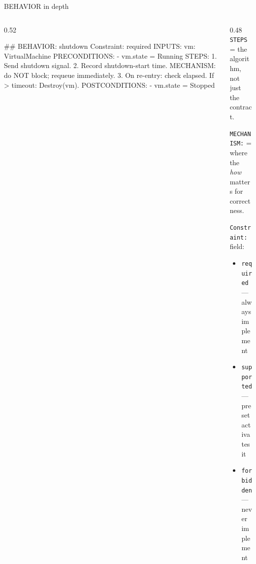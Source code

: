 \documentclass[
  10pt,
  ignorenonframetext,
  aspectratio=169,
  10pt]{beamer}
\newenvironment{Shaded}{}{}
\newcommand{\FunctionTok}[1]{\textcolor[rgb]{0.02,0.16,0.49}{#1}}
\newcommand{\NormalTok}[1]{#1}
\newcommand{\SpecialStringTok}[1]{\textcolor[rgb]{0.73,0.40,0.53}{#1}}
\providecommand{\tightlist}{%
  \setlength{\itemsep}{0pt}\setlength{\parskip}{0pt}}
\begin{document}
\begin{frame}[fragile]{BEHAVIOR in depth}
\protect\hypertarget{behavior-in-depth}{}
\begin{columns}[T]
\begin{column}{0.52\textwidth}
\begin{Shaded}
\begin{Highlighting}[]
\FunctionTok{\#\# BEHAVIOR: shutdown}
\NormalTok{Constraint: required}
\NormalTok{INPUTS:}
\NormalTok{  vm: VirtualMachine}
\NormalTok{PRECONDITIONS:}
\SpecialStringTok{  {-} }\NormalTok{vm.state = Running}
\NormalTok{STEPS:}
\SpecialStringTok{  1. }\NormalTok{Send shutdown signal.}
\SpecialStringTok{  2. }\NormalTok{Record shutdown{-}start time.}
\NormalTok{     MECHANISM: do NOT block;}
\NormalTok{     requeue immediately.}
\SpecialStringTok{  3. }\NormalTok{On re{-}entry: check elapsed.}
\NormalTok{     If \textgreater{} timeout: Destroy(vm).}
\NormalTok{POSTCONDITIONS:}
\SpecialStringTok{  {-} }\NormalTok{vm.state = Stopped}
\end{Highlighting}
\end{Shaded}
\end{column}

\begin{column}{0.48\textwidth}
\texttt{STEPS} = the algorithm,\\
not just the contract.

\bigskip

\texttt{MECHANISM:} = where the\\
\emph{how} matters for correctness.

\bigskip

\texttt{Constraint:} field:

\begin{itemize}
\tightlist
\item
  \texttt{required} --- always implement
\item
  \texttt{supported} --- preset activates it
\item
  \texttt{forbidden} --- never implement
\end{itemize}
\end{column}
\end{columns}
\end{frame}
\end{document}
